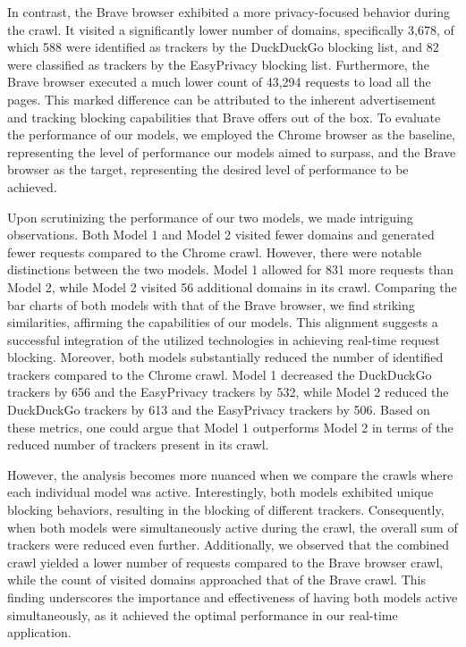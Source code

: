 In contrast, the Brave browser exhibited a more privacy-focused behavior during the crawl. It visited a significantly
lower number of domains, specifically 3,678, of which 588 were identified as trackers by the DuckDuckGo blocking list, and 82 were
classified as trackers by the EasyPrivacy blocking list. Furthermore, the Brave browser executed a much lower count of 43,294
requests to load all the pages. This marked difference can be attributed to the inherent advertisement and tracking blocking capabilities 
that Brave offers out of the box. To evaluate the performance of our models, we employed the Chrome browser as the baseline,
representing the level of performance our models aimed to surpass, and the Brave browser as the target, representing the desired
level of performance to be achieved.

Upon scrutinizing the performance of our two models, we made intriguing observations. Both Model 1 and Model 2 visited fewer
domains and generated fewer requests compared to the Chrome crawl. However, there were notable distinctions between the two models.
Model 1 allowed for 831 more requests than Model 2, while Model 2 visited 56 additional domains in its crawl. Comparing the bar charts
of both models with that of the Brave browser, we find striking similarities, affirming the capabilities of our models. This alignment
suggests a successful integration of the utilized technologies in achieving real-time request blocking. Moreover, both models
substantially reduced the number of identified trackers compared to the Chrome crawl. Model 1 decreased the DuckDuckGo trackers
by 656 and the EasyPrivacy trackers by 532, while Model 2 reduced the DuckDuckGo trackers by 613 and the EasyPrivacy trackers
by 506. Based on these metrics, one could argue that Model 1 outperforms Model 2 in terms of the reduced number of trackers
present in its crawl.

However, the analysis becomes more nuanced when we compare the crawls where each individual model was active. Interestingly,
both models exhibited unique blocking behaviors, resulting in the blocking of different trackers. Consequently, when both models
were simultaneously active during the crawl, the overall sum of trackers were reduced even further. Additionally, we observed that the
combined crawl yielded a lower number of requests compared to the Brave browser crawl, while the count of visited domains
approached that of the Brave crawl. This finding underscores the importance and effectiveness of having both models active
simultaneously, as it achieved the optimal performance in our real-time application.

